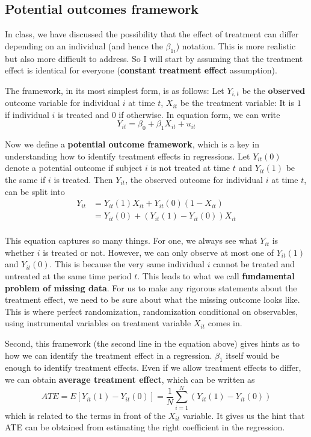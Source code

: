 \documentclass[12pt]{article}
\theoremstyle{definition}
\theoremstyle{property}
\theoremstyle{assumption}
\theoremstyle{example}
\theoremstyle{comment}
\begin{document}
\begin{mdframed}[backgroundcolor =blue!10]
\begin{itemize}
\end{itemize}
\end{mdframed} \par\medskip

\subsection{Potential outcomes framework}
In class, we have discussed the possibility that the effect of treatment can differ depending on an individual (and hence the $\beta_{1i}$) notation. This is more realistic but also more difficult to address. So I will start by assuming that the treatment effect is identical for everyone (\textbf{constant treatment effect} assumption).\par\medskip
The framework, in its most simplest form, is as follows: Let $Y_{i,t}$ be the \textbf{observed} outcome variable for individual $i$ at time $t$, $X_{it}$ be the treatment variable: It is $1$ if individual $i$ is treated and $0$ if otherwise. In equation form, we can write
\[
Y_{it}=\beta_0+\beta_1X_{it}+u_{it}
\]
\par\medskip
Now we define a \textbf{potential outcome framework}, which is a key in understanding how to identify treatment effects in regressions.  Let $Y_{it}(0)$ denote a potential outcome if subject $i$ is not treated at time $t$ and $Y_{it}(1)$ be the same if $i$ is treated. Then $Y_{it}$, the observed outcome for individual $i$ at time $t$, can be split into
\[
\begin{aligned}
Y_{it} & = Y_{it}(1)X_{it}+Y_{it}(0)(1-X_{it})\\
&=Y_{it}(0)+(Y_{it}(1)-Y_{it}(0))X_{it} \\
\end{aligned}
\] 
\par\medskip
This equation captures so many things. For one, we always see what $Y_{it}$ is whether $i$ is treated or not. However, we can only observe at most one of $Y_{it}(1)$ and $Y_{it}(0)$. This is because the very same individual $i$ cannot be treated and untreated at the same time period $t$. This leads to what we call \textbf{fundamental problem of missing data}. For us to make any rigorous statements about the treatment effect, we need to be sure about what the missing outcome looks like. This is where perfect randomization, randomization conditional on observables, using instrumental variables on treatment variable $X_{it}$ comes in.
\par\medskip
Second, this framework (the second line in the equation above) gives hints as to how we can identify the treatment effect in a regression. $\beta_1$ itself would be enough to identify treatment effects. Even if we allow treatment effects to differ, we can obtain \textbf{average treatment effect}, which can be written as
\[
ATE = E[Y_{it}(1)-Y_{it}(0)]=\frac{1}{N}\sum_{i=1}^N(Y_{it}(1)-Y_{it}(0))
\]
which is related to the terms in front of the $X_{it}$ variable. It gives us the hint that ATE can be obtained from estimating the right coefficient in the regression. 
\end{document}
